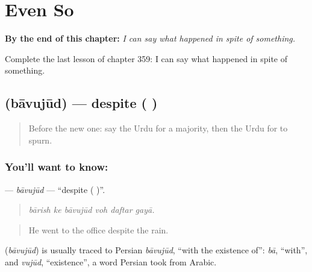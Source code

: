 
\chapter{Even So}
\label{ch:ur-even-so}

\begin{chapteropening}
\textbf{By the end of this chapter:} \emph{I can say what happened in spite of something.}

Complete the last lesson of chapter 359: I can say what happened in spite of something.
\end{chapteropening}

\section[\texorpdfstring{\ur{باوجود} (bāvujūd)}{باوجود (bāvujūd)}]{ (bāvujūd) — despite ( )}

\label{lesson:UR-C359-bavujud}



\begin{quote}
Before the new one: say the Urdu for a majority, then the Urdu for to spurn.
\end{quote}

\subsection*{You'll want to know: }
\textbf{} — \emph{bāvujūd} — \textquotedblleft{}despite ( )\textquotedblright{}.

\begin{quote}
     
\end{quote}

\begin{quote}
\emph{bārish ke bāvujūd voh daftar gayā.}
\end{quote}

\begin{quote}
He went to the office despite the rain.
\end{quote}

\begin{cousinweb}
\textbf{} (\emph{bāvujūd}) is usually traced to Persian \emph{bāvujūd}, \textquotedblleft{}with the existence of\textquotedblright{}: \emph{bā}, \textquotedblleft{}with\textquotedblright{}, and \emph{vujūd}, \textquotedblleft{}existence\textquotedblright{}, a word Persian took from Arabic.
\end{cousinweb}

